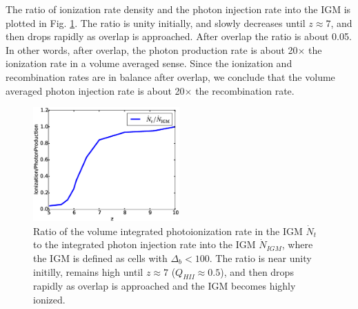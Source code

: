 The ratio of ionization rate density and the photon injection rate into the IGM is plotted in Fig. \ref{Ndot_Ratio}. The ratio is unity initially, and slowly decreases until $z\approx 7$, and then drops rapidly as overlap is approached. After overlap the ratio is about 0.05. In other words, after overlap, the photon production rate is about 20$\times$ the ionization rate in a volume averaged sense. Since the ionization and recombination rates are in balance after overlap, we conclude that the volume averaged photon injection rate is about 20$\times$ the recombination rate. 


\begin{figure}
	\includegraphics[width=0.5\textwidth]{Ndot_Ratio.eps}
	\caption{Ratio of the volume integrated photoionization rate in the IGM $\dot{N}_t$ to the integrated photon injection rate into the IGM $\dot{N}_{IGM}$, where the IGM is defined as cells with $\Delta_b < 100$. The ratio is near unity initilly, remains high until $z\approx 7$ ($Q_{HII} \approx 0.5$), and then drops rapidly as overlap is approached and the IGM becomes highly ionized.}
	\label{Ndot_Ratio}
\end{figure}



